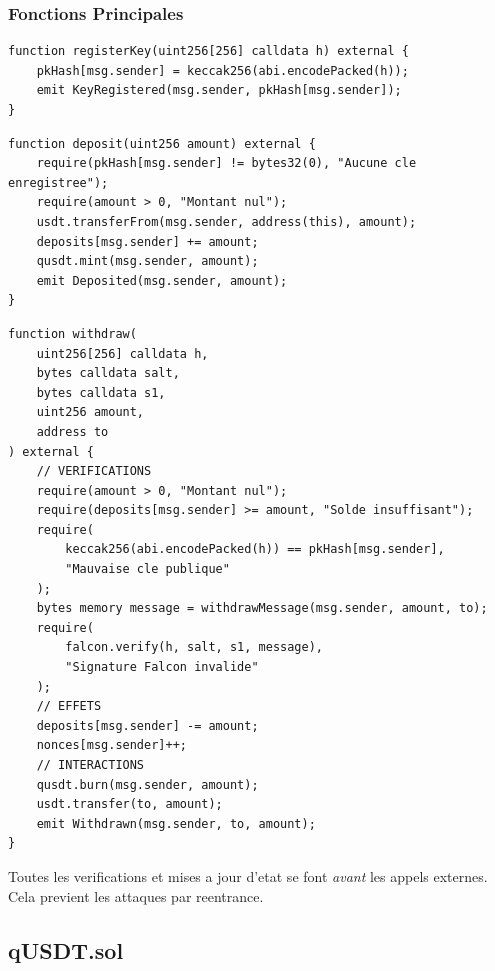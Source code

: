 \documentclass[11pt,a4paper]{article}
\begin{document}
\subsubsection{Fonctions Principales}

\begin{lstlisting}[style=solidity, caption={registerKey}]
function registerKey(uint256[256] calldata h) external {
    pkHash[msg.sender] = keccak256(abi.encodePacked(h));
    emit KeyRegistered(msg.sender, pkHash[msg.sender]);
}
\end{lstlisting}

\begin{lstlisting}[style=solidity, caption={deposit}]
function deposit(uint256 amount) external {
    require(pkHash[msg.sender] != bytes32(0), "Aucune cle enregistree");
    require(amount > 0, "Montant nul");
    usdt.transferFrom(msg.sender, address(this), amount);
    deposits[msg.sender] += amount;
    qusdt.mint(msg.sender, amount);
    emit Deposited(msg.sender, amount);
}
\end{lstlisting}

\begin{lstlisting}[style=solidity, caption={withdraw (Verifications-Effets-Interactions)}]
function withdraw(
    uint256[256] calldata h,
    bytes calldata salt,
    bytes calldata s1,
    uint256 amount,
    address to
) external {
    // VERIFICATIONS
    require(amount > 0, "Montant nul");
    require(deposits[msg.sender] >= amount, "Solde insuffisant");
    require(
        keccak256(abi.encodePacked(h)) == pkHash[msg.sender],
        "Mauvaise cle publique"
    );
    bytes memory message = withdrawMessage(msg.sender, amount, to);
    require(
        falcon.verify(h, salt, s1, message),
        "Signature Falcon invalide"
    );
    // EFFETS
    deposits[msg.sender] -= amount;
    nonces[msg.sender]++;
    // INTERACTIONS
    qusdt.burn(msg.sender, amount);
    usdt.transfer(to, amount);
    emit Withdrawn(msg.sender, to, amount);
}
\end{lstlisting}

\begin{infobox}
Toutes les verifications et mises a jour d'etat se font \textit{avant} les appels externes.
Cela previent les attaques par reentrance.
\end{infobox}

\subsection{qUSDT.sol}
\end{document}
